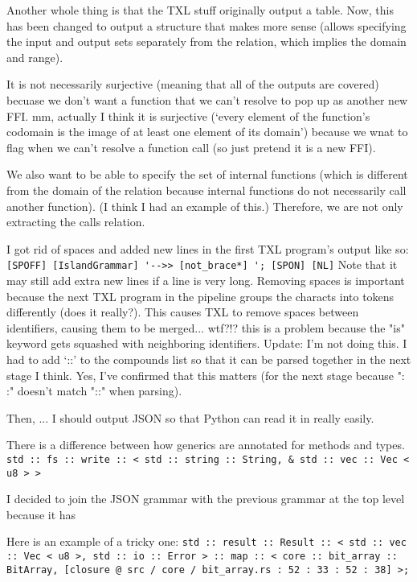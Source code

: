 \documentclass[11pt]{article}
\begin{document}
Another whole thing is that the TXL stuff originally output a table.
Now, this has been changed to output a structure that makes more sense (allows specifying the input and output sets separately from the relation, which implies the domain and range).

It is not necessarily surjective (meaning that all of the outputs are covered) becuase we don't want a function that we can't resolve to pop up as another new FFI.
mm, actually I think it is surjective (`every element of the function's codomain is the image of at least one element of its domain') because we wnat to flag when we can't resolve a function call (so just pretend it is a new FFI).

We also want to be able to specify the set of internal functions (which is different from the domain of the relation because internal functions do not necessarily call another function).
(I think I had an example of this.)
Therefore, we are not only extracting the calls relation.

I got rid of spaces and added new lines in the first TXL program's output like so:
\lstinline{[SPOFF] [IslandGrammar] '-->> [not_brace*] '; [SPON] [NL]}
Note that it may still add extra new lines if a line is very long.
Removing spaces is important because the next TXL program in the pipeline groups the characts into tokens differently (does it really?).
This causes TXL to remove spaces between identifiers, causing them to be merged... wtf?!?
    this is a problem because the "is" keyword gets squashed with neighboring identifiers.
Update:
I'm not doing this.
I had to add `::' to the compounds list so that it can be parsed together in the next stage I think.
    Yes, I've confirmed that this matters (for the next stage because ": :" doesn't match "::" when parsing).

Then, ... I should output JSON so that Python can read it in really easily.

There is a difference between how generics are annotated for methods and types.
\lstinline{std :: fs :: write :: < std :: string :: String, & std :: vec :: Vec < u8 > >}

I decided to join the JSON grammar with the previous grammar at the top level because it has 

Here is an example of a tricky one:
\lstinline{std :: result :: Result :: < std :: vec :: Vec < u8 >, std :: io :: Error > :: map :: < core :: bit_array :: BitArray, [closure @ src / core / bit_array.rs : 52 : 33 : 52 : 38] >;}
\end{document}
